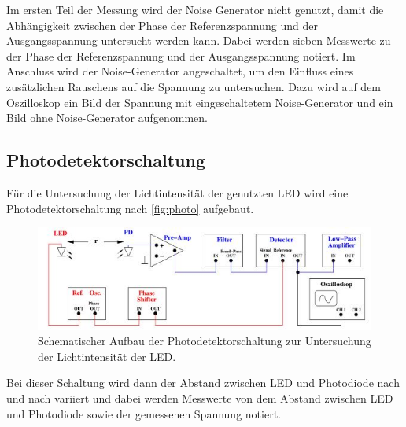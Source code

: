 \noindent
Im ersten Teil der Messung wird der Noise Generator nicht genutzt, damit die Abhängigkeit zwischen der Phase der Referenzspannung und der Ausgangsspannung untersucht werden kann. Dabei werden sieben Messwerte zu der Phase der Referenzspannung und der Ausgangsspannung notiert. \newline
Im Anschluss wird der Noise-Generator angeschaltet, um den Einfluss eines zusätzlichen Rauschens auf die Spannung zu untersuchen. Dazu wird auf dem Oszilloskop ein Bild der Spannung mit eingeschaltetem Noise-Generator und ein Bild ohne Noise-Generator aufgenommen. 
\subsection{Photodetektorschaltung}
Für die Untersuchung der Lichtintensität der genutzten LED wird eine Photodetektorschaltung nach \autoref{fig:photo} aufgebaut.
\begin{figure}[H]
    \centering
    \includegraphics{images/photo.JPG}
    \caption{Schematischer Aufbau der Photodetektorschaltung zur Untersuchung der Lichtintensität der LED. \cite{sample}}
    \label{fig:photo}
\end{figure}
\noindent
Bei dieser Schaltung wird dann der Abstand zwischen LED und Photodiode nach und nach variiert und dabei werden Messwerte von dem Abstand zwischen LED und Photodiode sowie der gemessenen Spannung notiert.